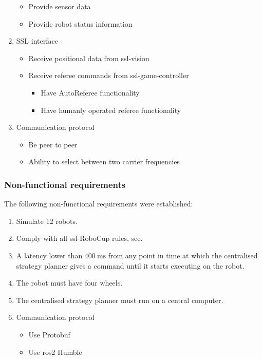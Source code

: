 \begin{enumerate}
\begin{itemize}
        \item Provide sensor data
        \item Provide robot status information
    \end{itemize}
    \item SSL interface
    \begin{itemize}
        \item Receive positional data from ssl-vision
        \item Receive referee commands from ssl-game-controller
        \begin{itemize}
            \item Have AutoReferee functionality
            \item Have humanly operated referee functionality
        \end{itemize} 
    \end{itemize}
    \item Communication protocol
    \begin{itemize}
        \item Be peer to peer
        \item Ability to select between two carrier frequencies
    \end{itemize}
\end{enumerate}



\subsubsection{Non-functional requirements}

The following non-functional requirements were established:
\begin{enumerate}
    \item Simulate 12 robots.
    \item Comply with all \ac{ssl}-RoboCup rules, see\:\cite{noauthor_rules_2024}.
    \item A latency lower than $400\:\text{ms}$ from any point in time at which the centralised strategy planner gives a command until it starts executing on the robot.
    \item The robot must have four wheels.
    \item The centralised strategy planner must run on a central computer.
    \item Communication protocol
    \begin{itemize}
        \item Use Protobuf
        \item Use \ac{ros2} Humble
    \end{itemize}
\end{enumerate}

